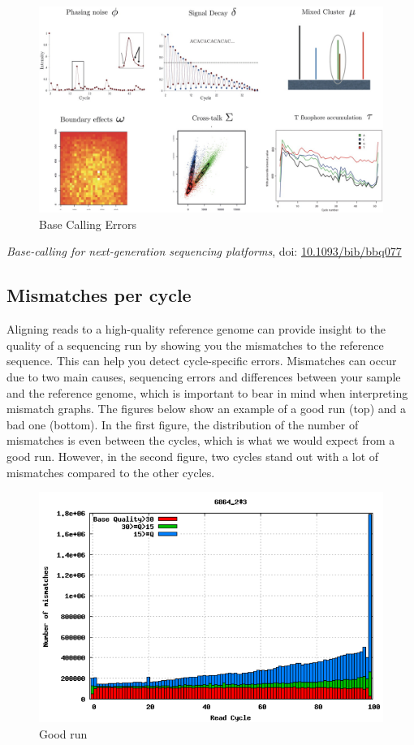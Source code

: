 \documentclass[11pt]{article}
\makeatletter
\def\maxwidth{\ifdim\Gin@nat@width>\linewidth\linewidth
    \else\Gin@nat@width\fi}
\let\Oldincludegraphics\includegraphics
\renewcommand{\includegraphics}[1]{\Oldincludegraphics[width=.8\maxwidth, height=.55\textheight, keepaspectratio]{#1}}
\makeatother
\begin{document}
    \begin{figure}[H]
\centering
\includegraphics{img/base_calling_errors.jpg}
\caption{Base Calling Errors}
\end{figure}

    \textit{Base-calling for next-generation sequencing platforms}, doi:
\href{https://academic.oup.com/bib/article/12/5/489/268399}{10.1093/bib/bbq077}

\hypertarget{mismatches-per-cycle}{%
\subsection{Mismatches per cycle}\label{mismatches-per-cycle}}

Aligning reads to a high-quality reference genome can provide insight to
the quality of a sequencing run by showing you the mismatches to the
reference sequence. This can help you detect cycle-specific errors.
Mismatches can occur due to two main causes, sequencing errors and
differences between your sample and the reference genome, which is
important to bear in mind when interpreting mismatch graphs. The figures
below show an example of a good run (top) and a bad one (bottom). In the
first figure, the distribution of the number of mismatches is even
between the cycles, which is what we would expect from a good run.
However, in the second figure, two cycles stand out with a lot of
mismatches compared to the other cycles.

    \begin{figure}[H]
\centering
\includegraphics{img/mismatch_per_cycle_pass.png}
\caption{Good run}
\end{figure}
\end{document}
